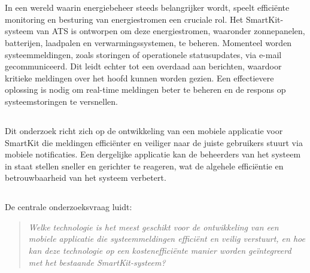
\chapter{}%
\label{ch:inleiding}

\noindent In een wereld waarin energiebeheer steeds belangrijker wordt, speelt efficiënte monitoring en besturing van energiestromen een cruciale rol. Het SmartKit-systeem van ATS is ontworpen om deze energiestromen, waaronder zonnepanelen, batterijen, laadpalen en verwarmingssystemen, te beheren. Momenteel worden systeemmeldingen, zoals storingen of operationele statusupdates, via e-mail gecommuniceerd. Dit leidt echter tot een overdaad aan berichten, waardoor kritieke meldingen over het hoofd kunnen worden gezien. Een effectievere oplossing is nodig om real-time meldingen beter te beheren en de respons op systeemstoringen te versnellen. \\

\section{}%
\label{sec:probleemstelling}

\noindent Dit onderzoek richt zich op de ontwikkeling van een mobiele applicatie voor SmartKit die meldingen efficiënter en veiliger naar de juiste gebruikers stuurt via mobiele notificaties. Een dergelijke applicatie kan de beheerders van het systeem in staat stellen sneller en gerichter te reageren, wat de algehele efficiëntie en betrouwbaarheid van het systeem verbetert. \\

\section{}%
\label{sec:onderzoeksvraag}

\noindent De centrale onderzoeksvraag luidt:

\begin{quote} 
    \textit{Welke technologie is het meest geschikt voor de ontwikkeling van een mobiele applicatie die systeemmeldingen efficiënt en veilig verstuurt, en hoe kan deze technologie op een kostenefficiënte manier worden geïntegreerd met het bestaande SmartKit-systeem?} 
\end{quote}

